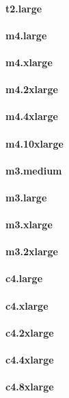 \documentclass{acm_proc_article-sp}
\begin{document}
\paragraph{t2.large}
\paragraph{m4.large}
\paragraph{m4.xlarge}
\paragraph{m4.2xlarge}
\paragraph{m4.4xlarge}
\paragraph{m4.10xlarge}
\paragraph{m3.medium}
\paragraph{m3.large}
\paragraph{m3.xlarge}
\paragraph{m3.2xlarge}
\paragraph{c4.large}
\paragraph{c4.xlarge}
\paragraph{c4.2xlarge}
\paragraph{c4.4xlarge}
\paragraph{c4.8xlarge}
\end{document}
